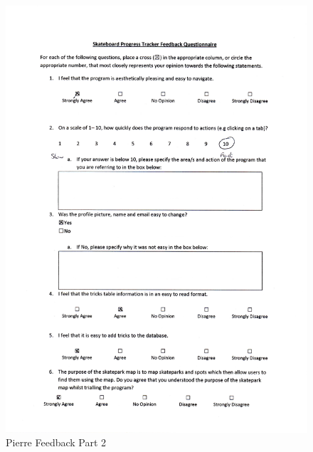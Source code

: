 \begin{figure}[H]
    \includegraphics[width=\textwidth]{./Evaluation/images/PierreFeedback1.pdf}
    \caption{Pierre Feedback Part 2} \label{fig:PierreFeedback2}
\end{figure}

